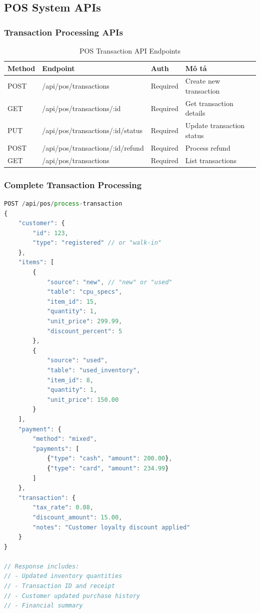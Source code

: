 \documentclass[12pt,a4paper]{article}
\begin{document}
\subsection{POS System APIs}
\subsubsection{Transaction Processing APIs}
\begin{table}[H]
\centering
\begin{tabular}{@{}llll@{}}
\toprule
\textbf{Method} & \textbf{Endpoint} & \textbf{Auth} & \textbf{Mô tả} \\
\midrule
POST & /api/pos/transactions & Required & Create new transaction \\
GET & /api/pos/transactions/:id & Required & Get transaction details \\
PUT & /api/pos/transactions/:id/status & Required & Update transaction status \\
POST & /api/pos/transactions/:id/refund & Required & Process refund \\
GET & /api/pos/transactions & Required & List transactions \\
\bottomrule
\end{tabular}
\caption{POS Transaction API Endpoints}
\end{table}

\subsubsection{Complete Transaction Processing}
\begin{lstlisting}[language=javascript, caption=Complete POS Transaction API]
POST /api/pos/process-transaction
{
    "customer": {
        "id": 123,
        "type": "registered" // or "walk-in"
    },
    "items": [
        {
            "source": "new", // "new" or "used"
            "table": "cpu_specs",
            "item_id": 15,
            "quantity": 1,
            "unit_price": 299.99,
            "discount_percent": 5
        },
        {
            "source": "used",
            "table": "used_inventory", 
            "item_id": 8,
            "quantity": 1,
            "unit_price": 150.00
        }
    ],
    "payment": {
        "method": "mixed",
        "payments": [
            {"type": "cash", "amount": 200.00},
            {"type": "card", "amount": 234.99}
        ]
    },
    "transaction": {
        "tax_rate": 0.08,
        "discount_amount": 15.00,
        "notes": "Customer loyalty discount applied"
    }
}

// Response includes:
// - Updated inventory quantities
// - Transaction ID and receipt
// - Customer updated purchase history
// - Financial summary
\end{lstlisting}
\end{document}
